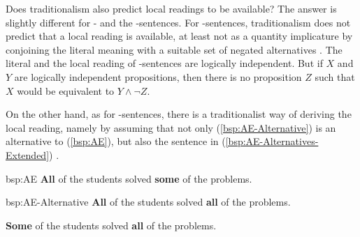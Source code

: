 \documentclass[fleqn,reqno,10pt]{article}
\newcommand{\as}{\acro{as}}
\renewcommand{\es}{\acro{es}}
\renewcommand{\mymark}[1]{\textbf{#1}}
\begin{document}
Does traditionalism also predict local readings to be available? The
answer is slightly different for \as- and the \es-sentences. For
\es-sentences, traditionalism does not predict that a local reading is
available, at least not as a quantity implicature by conjoining the
literal meaning with a suitable set of negated alternatives
\citep[see][]{GeurtsPouscoulous2009:Embedded-Implic,ChemlaSpector2010:Experimental-Ev}. The
literal and the local reading of \es-sentences are logically
independent. But if $X$ and $Y$ are logically independent
propositions, then there is no proposition $Z$ such that $X$ would be
equivalent to $Y \wedge \neg Z$.

On the other hand, as for \as-sentences, there is a traditionalist way
of deriving the local reading, namely by assuming that not only
(\ref{bsp:AE-Alternative}) is an alternative to (\ref{bsp:AE}), but
also the sentence in (\ref{bsp:AE-Alternatives-Extended}) \citep[e.g.][]{Sauerland2004:Scalar-Implicat}.

\begin{exer}{bsp:AE}
  \ex \mymark{All} of the students solved \mymark{some} of the problems.
\end{exer}

\begin{exer}{bsp:AE-Alternative}
  \ex \label{bsp:AE-Alternatives-Standard}\mymark{All} of the students solved \mymark{all} of the problems.
\end{exer}

\begin{exe}
\ex \label{bsp:AE-Alternatives-Extended} \mymark{Some} of the students solved \mymark{all} of the problems.
\end{exe}
\end{document}
